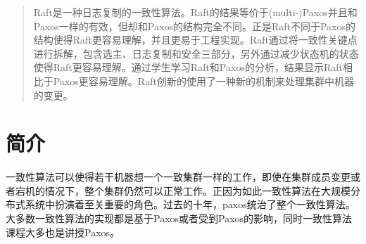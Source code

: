 \documentclass[journal]{IEEEtran}
\begin{document}







\maketitle

\begin{abstract}
Raft是一种日志复制的一致性算法。Raft的结果等价于(multi-)Paxos并且和Paxos一样的有效，但却和Paxos的结构完全不同。正是Raft不同于Paxos的结构使得Raft更容易理解，并且更易于工程实现。Raft通过将一致性关键点进行拆解，包含选主、日志复制和安全三部分，另外通过减少状态机的状态使得Raft更容易理解。通过学生学习Raft和Paxos的分析，结果显示Raft相比于Paxos更容易理解。Raft创新的使用了一种新的机制来处理集群中机器的变更。
\end{abstract}







%
\IEEEpeerreviewmaketitle



\section{简介}
% 
% 
% 
% 
一致性算法可以使得若干机器想一个一致集群一样的工作，即使在集群成员变更或者宕机的情况下，整个集群仍然可以正常工作。正因为如此一致性算法在大规模分布式系统中扮演着至关重要的角色。过去的十年，paxos统治了整个一致性算法。大多数一致性算法的实现都是基于Paxos或者受到Paxos的影响，同时一致性算法课程大多也是讲授Paxos。
\end{document}
